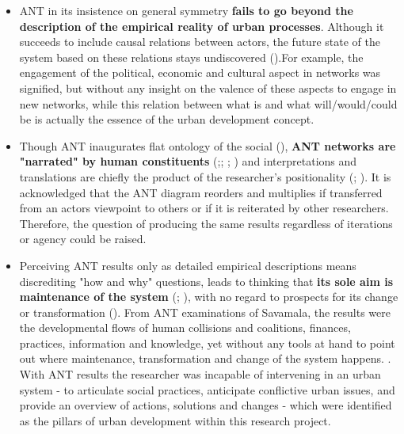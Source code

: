 \documentclass[11pt]{report}
\begin{document}
{{{\begin{itemize}
\item ANT in its insistence on general symmetry \textbf{fails to go beyond the description of the empirical reality of urban processes}. Although it succeeds to include causal relations between actors, the future state of the system based on these relations stays undiscovered (\href{ref}{\citealt{elder-vass_searching_2008}}).For example, the engagement of the political, economic and cultural aspect in networks was signified, but without any insight on the valence of these aspects to engage in new networks, while this relation between what is and what will/would/could be is actually the essence of the urban development concept.

\item Though ANT inaugurates flat ontology of the social (\href{ref}{\citealt{latour_reassembling_2005}}), \textbf{ANT networks are "narrated" by human constituents} (\href{ref}{\citealt{pickering_epistemological_1992}};\href{ref}{\citealt{czarniawska_narrating_1997}}; \href{ref}{\citealt{whittle_is_2008}};  \href{ref}{\citealt{marshall_mapping_2015}}) and interpretations and translations are chiefly the product of the researcher's positionality  (\href{ref}{\citealt{rose_situating_1997}}; \href{ref}{\citealt{ruming_following_2009}}). It is acknowledged that the ANT diagram reorders and multiplies if transferred from an actors viewpoint to others or if it is reiterated by other researchers. Therefore, the question of producing the same results regardless of iterations or agency could be raised.

\item Perceiving ANT results only as detailed empirical descriptions means discrediting "how and why" questions, leads to thinking that \textbf{its sole aim is maintenance of the system} (\citealt{amsterdamska_surely_1990}; \citealt{lee_otherness_1994}), with no regard to prospects for its change or transformation (\href{ref}{\citealt{gabriel_post-social_2008}}).
From ANT examinations of Savamala, the results were the developmental flows of human collisions and coalitions, finances, practices, information and knowledge, yet without any tools at hand to point out where maintenance, transformation and change of the system happens.
. With ANT results the researcher was incapable of intervening in an urban system - to articulate social practices, anticipate conflictive urban issues, and provide an overview of actions, solutions and changes - which were identified as the pillars of urban development within this research project.
\end{itemize}
 
}}}
\end{document}
